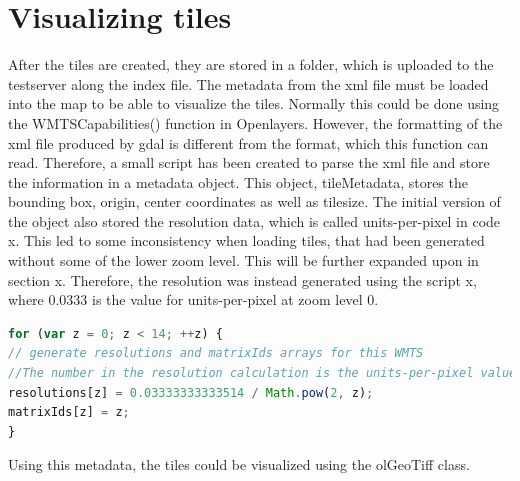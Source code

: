 \section{Visualizing tiles}
After the tiles are created, they are stored in a folder, which is uploaded to the testserver along the index file. 
The metadata from the xml file must be loaded into the map to be able to visualize the tiles. Normally this could be done using the WMTSCapabilities() function in Openlayers.
\citep{WmtsOl}
However, the formatting of the xml file produced by gdal is different from the format, which this function can read. Therefore, a small script has been created to parse the xml file and store the information in a metadata object. This object, tileMetadata, stores the bounding box, origin, center coordinates as well as tilesize. The initial version of the object also stored the resolution data, which is called units-per-pixel in code x. This led to some inconsistency when loading tiles, that had been generated without some of the lower zoom level. This will be further expanded upon in section x. Therefore, the resolution was instead generated using the script x, where 0.0333 is the value for units-per-pixel at zoom level 0. 

\begin{lstlisting}[language=JavaScript, caption={The JavaScript in the project}, label= VoresJS,escapechar=|]
for (var z = 0; z < 14; ++z) {
// generate resolutions and matrixIds arrays for this WMTS
//The number in the resolution calculation is the units-per-pixel value at zoomlayer 0 in the xml file generated by gdal2tiles
resolutions[z] = 0.03333333333514 / Math.pow(2, z);
matrixIds[z] = z;
}
\end{lstlisting}
Using this metadata, the tiles could be visualized using the olGeoTiff class. 



